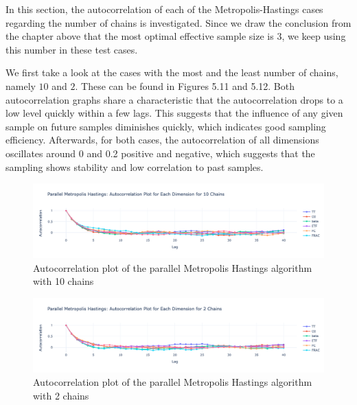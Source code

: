 In this section, the autocorrelation of each of the Metropolis-Hastings cases regarding the number of chains is investigated. Since we draw the conclusion from the chapter above that the most optimal effective sample size is $3$, we keep using this number in these test cases.

We first take a look at the cases with the most and the least number of chains, namely $10$ and $2$. These can be found in Figures 5.11 and 5.12. Both autocorrelation graphs share a characteristic that the autocorrelation drops to a low level quickly within a few lags. This suggests that the influence of any given sample on future samples diminishes quickly, which indicates good sampling efficiency. Afterwards, for both cases, the autocorrelation of all dimensions oscillates around 0 and 0.2 positive and negative, which suggests that the sampling shows stability and low correlation to past samples. 

\begin{figure}[H]
    \centering
    \includegraphics[width=1\textwidth]{figures/parallel_mh/Autocorrelation_10.png}
    \captionsetup{width=.8\textwidth}
    \caption{Autocorrelation plot of the parallel Metropolis Hastings algorithm with 10 chains}
    \label{fig:enter-label}
\end{figure}


\begin{figure}[H]
    \centering
    \includegraphics[width=1\textwidth]{figures/parallel_mh/Autocorrelation_2.png}
    \captionsetup{width=.8\textwidth}
    \caption{Autocorrelation plot of the parallel Metropolis Hastings algorithm with 2 chains}
    \label{fig:enter-label}
\end{figure}


